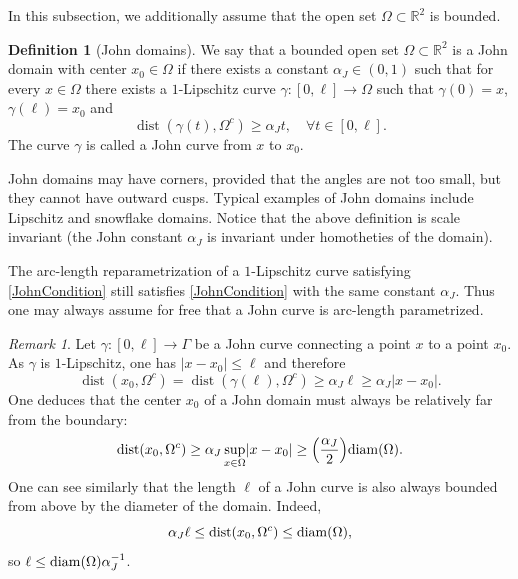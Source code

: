 \documentclass[12pt]{article}
\theoremstyle{definition}
\newtheorem{definition}[theorem]{Definition}
\theoremstyle{remark}
\newtheorem{remark}[theorem]{Remark}
\numberwithin{equation}{section}
\DeclareMathOperator{\dist}{dist}
\newcommand{\abs}[1]{\lvert #1 \rvert}
\newcommand{\R}{\mathbb{R}}
\begin{document}
In this subsection, we additionally assume that the open set $\Omega\subset\R^2$ is bounded.

\begin{definition}[John domains]
    We say that a bounded open set $\Omega \subset \R^2$ is a John domain with center $x_0 \in \Omega$ if there exists
    a constant $\alpha_J \in (0,1)$ such that for every $x\in\Omega$ there exists a $1$-Lipschitz 
    curve $\gamma \colon [0,\ell] \longrightarrow \Omega$ such that $\gamma(0)=x$, $\gamma(\ell)=x_0$ and 
    \begin{equation}\label{JohnCondition}
        \dist(\gamma(t),\Omega^c)\geq \alpha_J t,\quad \forall t \in [0,\ell].
    \end{equation}
    The curve $\gamma$ is called a  John curve from $x$ to $x_0$.
\end{definition}
John domains may have corners, provided that the angles are not too small, but they cannot have outward cusps. Typical
examples of John domains include Lipschitz and snowflake domains. Notice that the above definition is scale invariant
(the John constant $\alpha_J$ is invariant under homotheties of the domain).

The arc-length reparametrization of a $1$-Lipschitz curve satisfying \eqref{JohnCondition} still satisfies
\eqref{JohnCondition} with the same constant $\alpha_J$. Thus one may always assume for free that a John curve is arc-length parametrized.

\begin{remark}\label{boundl}
    Let $\gamma : [0,\ell] \longrightarrow \Gamma$ be a John curve connecting a point $x$
    to a point $x_0$. As $\gamma$ is $1$-Lipschitz, one has $\abs{x - x_0} \leq \ell$ and therefore
    \begin{equation*}
        \dist(x_0,\Omega^c) = \dist(\gamma(\ell),\Omega^c) \geq \alpha_J \ell \geq \alpha_J \abs{x - x_0}.
    \end{equation*}
    One deduces that the center $x_0$ of a John domain must always be relatively far
    from the boundary:
    \begin{equation}
        \dist(x_0,\Omega^c) \geq \alpha_J \sup_{x \in \Omega} \abs{x - x_0}
        \geq \Bigl(\frac{\alpha_J}{2}\Bigr) \mathrm{diam}(\Omega).
    \end{equation}
    One can see similarly that the length $\ell$ of a John curve is also always bounded from above by the diameter of
    the domain. Indeed,
    \begin{equation}
        \alpha_J \ell \leq \dist(x_0,\Omega^c)\leq {\rm diam}(\Omega),
    \end{equation}
    so $\ell \leq {\rm diam}(\Omega)\alpha_J^{-1}$. 
\end{remark}
\end{document}
